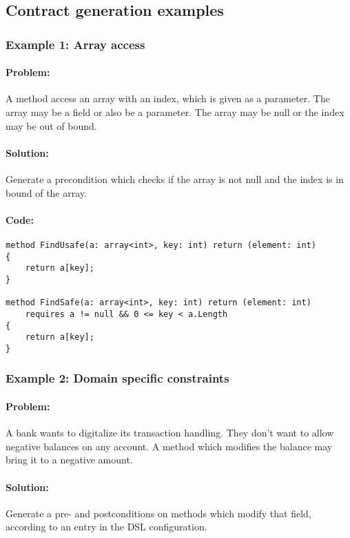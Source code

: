 \subsection{Contract generation examples}


\subsubsection{Example 1: Array access}

\paragraph{Problem:}

A method access an array with an index, which is given as a parameter. The array may be a field or also be a parameter. The array may be null or the index may be out of bound.
\paragraph{Solution:}
Generate a precondition which checks if the array is not null and the index is in bound of the array.
\paragraph{Code:}
\lstset{style=dafny}
\begin{lstlisting}
method FindUsafe(a: array<int>, key: int) return (element: int)
{
	return a[key];
}

method FindSafe(a: array<int>, key: int) return (element: int)
	requires a != null && 0 <= key < a.Length
{
	return a[key];
}
\end{lstlisting}



\subsubsection{Example 2: Domain specific constraints}
\paragraph{Problem:}
A bank wants to digitalize its transaction handling. They don’t want to allow negative balances on any account. A method which modifies the balance may bring it to a negative amount.
\paragraph{Solution:}
Generate a pre- and postconditions on methods which modify that field, according to an entry in the DSL configuration.
